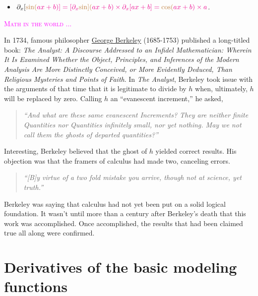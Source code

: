 \documentclass[
  letterpaper,
  DIV=11,
  numbers=noendperiod,
  oneside]{scrreprt}
\providecommand{\tightlist}{%
  \setlength{\itemsep}{0pt}\setlength{\parskip}{0pt}}
\newenvironment{intheworld}%
{%
\textcolor{magenta}{\hrulefill}%
  \par\vspace{.3\baselineskip}%
  \textcolor{magenta}{\scshape Math in the world ...}%
  \par\vspace{\baselineskip}%
}%
{\textcolor{magenta}{\hrulefill}}
\begin{document}
\begin{itemize}
\tightlist
\item
  \(\large\partial_x [\color{brown}\sin(\color{magenta}{a x + b})] = [\partial_x \color{brown}{\sin}](\color{magenta}{a x + b}) \times \partial_x [\color{magenta}{ax + b}] = \color{brown}{\cos}(\color{magenta}{ax + b}) \times \color{magenta}a\).
\end{itemize}

\begin{intheworld}
In 1734, famous philosopher
\href{https://en.wikipedia.org/wiki/George_Berkeley}{George Berkeley}
(1685-1753) published a long-titled book: \emph{The Analyst: A Discourse
Addressed to an Infidel Mathematician: Wherein It Is Examined Whether
the Object, Principles, and Inferences of the Modern Analysis Are More
Distinctly Conceived, or More Evidently Deduced, Than Religious
Mysteries and Points of Faith}. In \emph{The Analyst}, Berkeley took
issue with the arguments of that time that it is legitimate to divide by
\(h\) when, ultimately, \(h\) will be replaced by zero. Calling \(h\) an
``evanescent increment,'' he asked,

\begin{quote}
\emph{``And what are these same evanescent Increments? They are neither
finite Quantities nor Quantities infinitely small, nor yet nothing. May
we not call them the ghosts of departed quantities?''}
\end{quote}

Interesting, Berkeley believed that the ghost of \(h\) yielded correct
results. His objection was that the framers of calculus had made two,
canceling errors.

\begin{quote}
\emph{``{[}B{]}y virtue of a two fold mistake you arrive, though not at
science, yet truth.''}
\end{quote}

Berkeley was saying that calculus had not yet been put on a solid
logical foundation. It wasn't until more than a century after Berkeley's
death that this work was accomplished. Once accomplished, the results
that had been claimed true all along were confirmed.

\end{intheworld}

\hypertarget{sec-basic-derivs}{%
\section{Derivatives of the basic modeling
functions}\label{sec-basic-derivs}}
\end{document}

